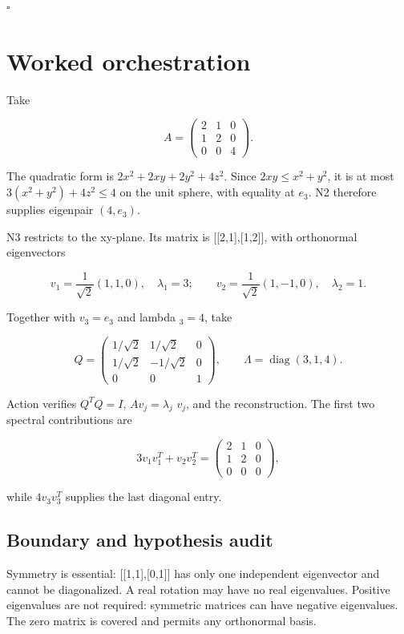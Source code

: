 \documentclass[preprint,12pt,aps,pra,showkeys,amsmath,amssymb,superscriptaddress,floatfix]{revtex4-2}
\theoremstyle{definition}
\theoremstyle{remark}
\begin{document}
\hfill$\square$

\section{Worked orchestration}

Take

\[A=\begin{pmatrix}2&1&0\\1&2&0\\0&0&4\end{pmatrix}.\]

The quadratic form is \(2x^2+2xy+2y^2+4z^2\). Since \(2xy\le x^2+y^2\),
it is at most \(3(x^2+y^2)+4z^2\le4\) on the unit sphere, with equality
at \(e_{3}\). N2 therefore supplies eigenpair \((4,e_{3})\).

N3 restricts to the xy-plane. Its matrix is {[}{[}2,1{]},{[}1,2{]}{]},
with orthonormal eigenvectors

\[v_1=\frac1{\sqrt2}(1,1,0),\quad\lambda_1=3;\qquad v_2=\frac1{\sqrt2}(1,-1,0),\quad\lambda_2=1.\]

Together with \(v_{3}=e_{3}\) and lambda \(_{3}=4\), take

\[Q=\begin{pmatrix}1/\sqrt2&1/\sqrt2&0\\1/\sqrt2&-1/\sqrt2&0\\0&0&1\end{pmatrix},\qquad\Lambda=\operatorname{diag}(3,1,4).\]

Action verifies \(Q^{T}Q=I\), \(Av_j=\lambda _j\) \(v_j\), and the
reconstruction. The first two spectral contributions are

\[3v_1v_1^T+v_2v_2^T=\begin{pmatrix}2&1&0\\1&2&0\\0&0&0\end{pmatrix},\]

while \(4v_3v_3^T\) supplies the last diagonal entry.

\subsection{Boundary and hypothesis audit}

Symmetry is essential: {[}{[}1,1{]},{[}0,1{]}{]} has only one
independent eigenvector and cannot be diagonalized. A real rotation may
have no real eigenvalues. Positive eigenvalues are not required:
symmetric matrices can have negative eigenvalues. The zero matrix is
covered and permits any orthonormal basis.
\end{document}
